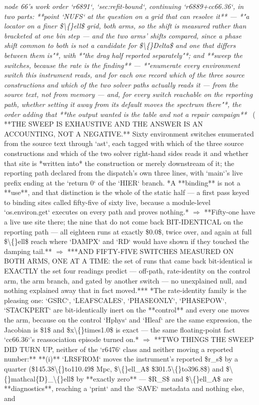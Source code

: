 \begin{description}
\textit{node 66's work order `r6891`, `sec:refit-bound`, continuing `r6889+cc66.36`, in two parts: **point `NUFS` at the question on a grid that can resolve it** --- *"a locator on a finer \$\textbackslash\{\}ell\$ grid, both arms, so the shift is measured rather than bracketed at one bin step --- and the two arms' shifts compared, since a phase shift common to both is not a candidate for \$\textbackslash\{\}Delta\$ and one that differs between them is"*, with *"the drag half reported separately"*; and **sweep the switches, because the rate is the finding** --- *"enumerate every environment switch this instrument reads, and for each one record which of the three source constructions and which of the two solver paths actually reads it --- from the source text, not from memory --- and, for every switch reachable on the reporting path, whether setting it away from its default moves the spectrum there"*, the order adding that **the output wanted is the table and not a repair campaign**} \ ( **THE SWEEP IS EXHAUSTIVE AND THE ANSWER IS AN ACCOUNTING, NOT A NEGATIVE.** Sixty environment switches enumerated from the source text through `ast`, each tagged with which of the three source constructions and which of the two solver right-hand sides reads it and whether that site is *written into* the construction or merely downstream of it; the reporting path declared from the dispatch's own three lines, with `main`'s live prefix ending at the `return 0` of the `HIER` branch.  *A **binding** is not a **use**, and that distinction is the whole of the static half --- a first pass keyed to binding sites called fifty-five of sixty live, because a module-level `os.environ.get` executes on every path and proves nothing.* \ensuremath{\Rightarrow} **Fifty-one have a live use site there; the nine that do not come back BIT-IDENTICAL on the reporting path --- all eighteen runs at exactly \$0.0\$, twice over, and again at full \$\textbackslash\{\}ell\$ reach where `DAMPX` and `RD` would have shown if they touched the damping tail.** \ensuremath{\Rightarrow} ***AND FIFTY-FIVE SWITCHES MEASURED ON BOTH ARMS, ONE AT A TIME: the set of runs that came back bit-identical is EXACTLY the set four readings predict --- off-path, rate-identity on the control arm, the arm branch, and gated by another switch --- no unexplained null, and nothing explained away that in fact moved.***  *The rate-identity family is the pleasing one: `GSRC`, `LEAFSCALES`, `PHASEONLY`, `PHASEPOW`, `STACKPERT` are bit-identically inert on the **control** and every one moves the arm, because on the control `Hphys` and `Hleaf` are the same expression, the Jacobian is \$1\$ and \$x\textbackslash\{\}times1.0\$ is exact --- the same floating-point fact `cc66.36`'s reassociation episode turned on.* \ensuremath{\Rightarrow}  **TWO THINGS THE SWEEP DID TURN UP, neither of the `r6476` class and neither moving a reported number:** **(i)** `LRSFROM` moves the instrument's reported \$r\_s\$ by a quarter (\$145.38\textbackslash\{\}to110.49\$ Mpc, \$\textbackslash\{\}ell\_A\$ \$301.5\textbackslash\{\}to396.8\$) and \$\textbackslash\{\}mathcal\{D\}\_\textbackslash\{\}ell\$ by **exactly zero** --- \$R\_S\$ and \$\textbackslash\{\}ell\_A\$ are **diagnostics**, reaching a `print` and the `SAVE` metadata and nothing else, and 
\end{description}
